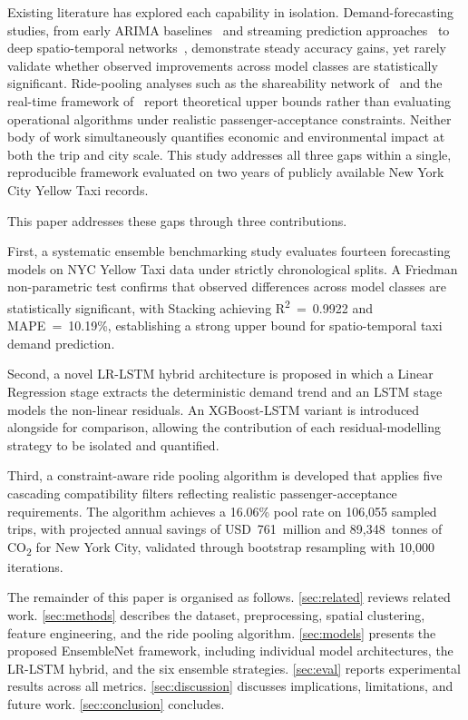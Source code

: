 \documentclass[a4paper,fleqn]{cas-dc}
\begin{document}
Existing literature has explored each capability in isolation.  Demand-forecasting studies, from early ARIMA baselines~\cite{dia2002object} and streaming prediction approaches~\cite{moreira2013predicting} to deep spatio-temporal networks~\cite{zhang2017deep,xu2017realtime,kim2020hybrid}, demonstrate steady accuracy gains, yet rarely validate whether observed improvements across model classes are statistically significant.  Ride-pooling analyses such as the shareability network of~\cite{santi2014quantifying} and the real-time framework of~\cite{alonso2017demand} report theoretical upper bounds rather than evaluating operational algorithms under realistic passenger-acceptance constraints.  Neither body of work simultaneously quantifies economic and environmental impact at both the trip and city scale.  This study addresses all three gaps within a single, reproducible framework evaluated on two years of publicly available New York City Yellow Taxi records.

This paper addresses these gaps through three contributions.

First, a systematic ensemble benchmarking study evaluates fourteen forecasting models on NYC Yellow Taxi data under strictly chronological splits.  A Friedman non-parametric test confirms that observed differences across model classes are statistically significant, with Stacking achieving R\textsuperscript{2}~=~0.9922 and MAPE~=~10.19\%, establishing a strong upper bound for spatio-temporal taxi demand prediction.

Second, a novel LR-LSTM hybrid architecture is proposed in which a Linear Regression stage extracts the deterministic demand trend and an LSTM stage models the non-linear residuals.  An XGBoost-LSTM variant is introduced alongside for comparison, allowing the contribution of each residual-modelling strategy to be isolated and quantified.

Third, a constraint-aware ride pooling algorithm is developed that applies five cascading compatibility filters reflecting realistic passenger-acceptance requirements.  The algorithm achieves a 16.06\% pool rate on 106,055 sampled trips, with projected annual savings of USD~761~million and 89{,}348~tonnes of CO\textsubscript{2} for New York City, validated through bootstrap resampling with 10,000 iterations.

The remainder of this paper is organised as follows.  \autoref{sec:related} reviews related work.  \autoref{sec:methods} describes the dataset, preprocessing, spatial clustering, feature engineering, and the ride pooling algorithm.  \autoref{sec:models} presents the proposed EnsembleNet framework, including individual model architectures, the LR-LSTM hybrid, and the six ensemble strategies.  \autoref{sec:eval} reports experimental results across all metrics.  \autoref{sec:discussion} discusses implications, limitations, and future work.  \autoref{sec:conclusion} concludes.
\end{document}
